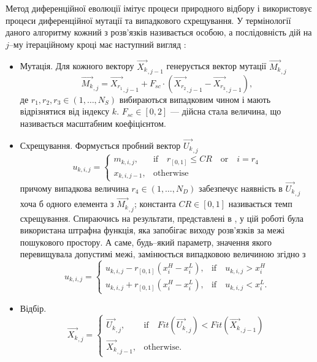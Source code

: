 Метод диференційної еволюції імітує процеси природного відбору і використовує процеси диференційної мутації та випадкового схрещування.
У термінології даного алгоритму кожний з розв'язків називається особою, а послідовність дій на $j$--му ітераційному кроці має наступний вигляд \cite{DEWang,DEModif}:
\begin{itemize}[leftmargin=0cm,itemindent=1em]
  \item Мутація. Для кожного вектору $\overrightarrow{X_{k}}_{,j-1}$ генерується вектор мутації $\overrightarrow{M_{k}}_{,j}$
  \begin{equation}
 \label{eqDEMut}
 \overrightarrow{M_{k}}_{,j}=\overrightarrow{X_{r_1}}_{,j-1}+F_{sc}\cdot\left(\overrightarrow{X_{r_2}}_{,j-1}-\overrightarrow{X_{r_3}}_{,j-1}\right),
 \end{equation}
 де $r_1,r_2,r_3\in(1,\ldots,N_S)$ вибираються випадковим чином і мають відрізнятися від індексу $k$.
 $F_{sc}\in[0,2]$  --- дійсна стала величина, що називається масштабним коефіцієнтом.


  \item Схрещування. Формується пробний вектор $\overrightarrow{U_{k}}_{,j}$
  \begin{equation}
 \label{eqDECros}
 u_{k,i,j}=\left\{
 \begin{array}{ll}
 m_{k,i,j},& \text{if} \quad r_{[0,1]}\leq C\!R \quad \text{or} \quad i=r_{4}\\
 x_{k,i,j-1},& \text{otherwise}
 \end{array}
 \right.
 \end{equation}
 причому випадкова величина $r_4\in(1,\ldots,N_D)$
забезпечує наявність в $\overrightarrow{U_{k}}_{,j}$ хоча б одного елемента з $\overrightarrow{M_{k}}_{,j}$;
 константа $C\!R\in[0,1]$ називається темп схрещування.
  Спираючись на результати, представлені в \cite{P-DE_Ishaque},
  у цій роботі  була використана штрафна функція, яка запобігає виходу розв'язків за межі пошукового простору.
  А саме, будь--який параметр, значення якого перевищувала допустимі межі, замінюється випадковою величиною згідно з
    \begin{equation}
 \label{eqDEPen}
 u_{k,i,j}=\left\{
 \begin{array}{ll}
 u_{k,i,j}-r_{[0,1]}(x_i^H-x_i^L),& \text{if} \quad u_{k,i,j}>x_i^H\\
 u_{k,i,j}+r_{[0,1]}(x_i^H-x_i^L),& \text{if} \quad u_{k,i,j}<x_i^L.
 \end{array}
 \right.
 \end{equation}
  \item Відбір.
      \begin{equation}
 \label{eqDESel}
 \overrightarrow{X_{k}}_{,j}=\left\{
 \begin{array}{ll}
\overrightarrow{U_{k}}_{,j},& \text{if} \quad Fit(\overrightarrow{U_k}_{,j})<Fit(\overrightarrow{X_k}_{,j-1})\\
 \overrightarrow{X_{k}}_{,j-1},& \text{otherwise}.
 \end{array}
 \right.
 \end{equation}

\end{itemize}
